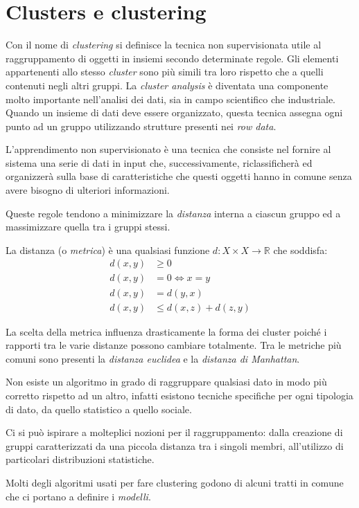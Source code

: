 \chapter{Clusters e clustering}
	Con il nome di \emph{clustering} si definisce la tecnica non supervisionata utile al raggruppamento di oggetti in insiemi secondo determinate regole. Gli elementi appartenenti allo stesso \emph{cluster} sono più simili tra loro rispetto che a quelli contenuti negli altri gruppi. La \emph{cluster analysis} è diventata una componente molto importante nell'analisi dei dati, sia in campo scientifico che industriale. Quando un insieme di dati deve essere organizzato, questa tecnica assegna ogni punto ad un gruppo utilizzando strutture presenti nei \emph{row data}.

	L'apprendimento non supervisionato è una tecnica che consiste nel fornire al sistema una serie di dati in input che, successivamente, riclassificherà ed organizzerà sulla base di caratteristiche che questi oggetti hanno in comune senza avere bisogno di ulteriori informazioni.

	Queste regole tendono a minimizzare la \emph{distanza} interna a ciascun gruppo ed a massimizzare quella tra i gruppi stessi.

	La distanza (o \emph{metrica}) è una qualsiasi funzione $d:X \times X \to \mathbb{R}$ che soddisfa\cite{definizione_di_distanza}:
	\begin{align*}
		d(x,y) &\geq 0 \\
		d(x,y) &= 0 \iff x=y \\
		d(x,y) &= d(y,x) \\
		d(x,y) &\leq d(x,z) + d(z,y)
	\end{align*}

	La scelta della metrica influenza drasticamente la forma dei cluster poiché i rapporti tra le varie distanze possono cambiare totalmente. Tra le metriche più comuni sono presenti la \emph{distanza euclidea} e la \emph{distanza di Manhattan}.

	Non esiste un algoritmo in grado di raggruppare qualsiasi dato in modo più corretto rispetto ad un altro, infatti esistono tecniche specifiche per ogni tipologia di dato, da quello statistico a quello sociale.

	Ci si può ispirare a molteplici nozioni per il raggruppamento: dalla creazione di gruppi caratterizzati da una piccola distanza tra i singoli membri, all’utilizzo di particolari distribuzioni statistiche.

	Molti degli algoritmi usati per fare clustering godono di alcuni tratti in comune che ci portano a definire i \emph{modelli}.

